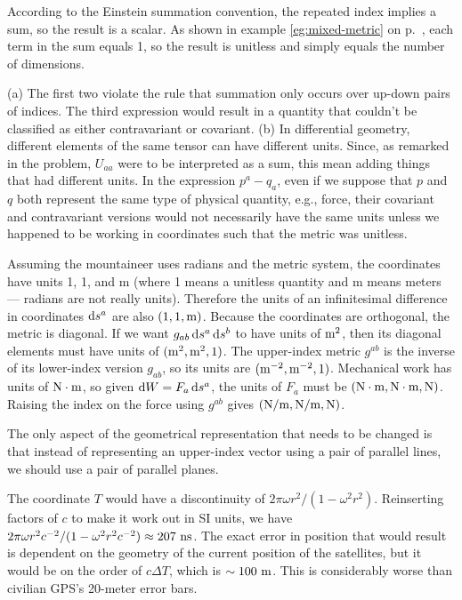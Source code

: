 According to the Einstein summation convention, the repeated index implies a sum, so the result is
a scalar. As shown in
example \ref{eg:mixed-metric} on p.~\pageref{eg:mixed-metric}, each term in the sum equals 1, so
the result is unitless and simply equals the number of dimensions.


(a) The first two violate the rule that summation only occurs over up-down pairs of indices.
The third expression would result in a quantity that couldn't be classified as either contravariant
or covariant. (b) In differential geometry, different elements of the same tensor can have different
units. Since, as remarked in the problem, $U_{aa}$ were to be interpreted as a sum, this mean adding things
that had different units. In the expression $p^a-q_a$, even if we suppose that $p$ and $q$ both represent
the same type of physical quantity, e.g., force, their covariant and contravariant versions would
not necessarily have the same units unless we happened to be working in coordinates such that the
metric was unitless.


Assuming the mountaineer uses radians and the metric system, the coordinates have units
1, 1, and m (where 1 means a unitless quantity and m means meters --- radians are not really units).
Therefore the units of an infinitesimal difference in coordinates $\operatorname{d\!} s^a$ are
also $(1,1,\textup{m})$. Because the coordinates are orthogonal, the metric is diagonal.
If we want $g_{ab}\operatorname{d\!} s^a \operatorname{d\!} s^b$ to have units of $\textup{m}^2$, then its diagonal elements
must have units of $(\textup{m}^2,\textup{m}^2,1)$.
%
The upper-index metric $g^{ab}$ is the inverse of its lower-index version $g_{ab}$, so its units are
$(\textup{m}^{-2},\textup{m}^{-2},1)$.
%
Mechanical work has units of $\textup{N}\cdot\textup{m}$,
so given $\operatorname{d\!} W=F_a \operatorname{d\!} s^a$, the units of $F_a$ must be $(\textup{N}\cdot\textup{m},\textup{N}\cdot\textup{m},\textup{N})$.
%
Raising the index on the force
using $g^{ab}$ gives $(\textup{N}/\textup{m},\textup{N}/\textup{m},\textup{N})$.


The only aspect of the geometrical representation that needs to be changed is that instead of
representing an upper-index vector using a pair of parallel lines, we should use a pair of parallel planes.


The coordinate $T$ would have a discontinuity of $2\pi\omega r^2/(1-\omega^2 r^2)$. Reinserting factors of $c$ to make it work
out in SI units, we have $2\pi\omega r^2 c^{-2}/(1-\omega^2 r^2 c^{-2}) \approx 207\ \textup{ns}$. The exact error in position that
would result is dependent on the geometry of the current position of the satellites, but it would be on the order of $c\Delta T$,
which is $\sim 100\ \textup{m}$. This is considerably worse than civilian GPS's 20-meter error bars.

